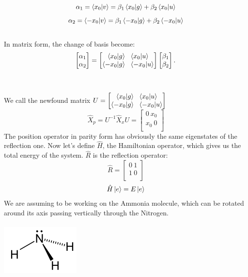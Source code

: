 \documentclass{article}
\begin{document}
$$ \alpha_1 =  \bra{x_0}\ket{v} = \beta_1 \bra{x_0}\ket{g} + \beta_2 \bra{x_0}\ket{u}$$
$$ \alpha_2 =  \bra{-x_0}\ket{v} = \beta_1 \bra{-x_0}\ket{g} + \beta_2 \bra{-x_0}\ket{u}$$\\
In matrix form, the change of basis become: \\
$$ \begin{bmatrix}
    \alpha_1 \\
    \alpha_2 \\ 
\end{bmatrix} = \begin{bmatrix}
    \bra{x_0}\ket{g} \ \ \bra{x_0}\ket{u} \\
    \bra{-x_0}\ket{g} \  \ \bra{-x_0}\ket{u} \\
\end{bmatrix} \begin{bmatrix}
    \beta_1 \\
    \beta_2 \\
\end{bmatrix}.$$ \\ \\
We call the newfound matrix $U = \begin{bmatrix}
    \bra{x_0}\ket{g} \ \ \bra{x_0}\ket{u} \\
    \bra{-x_0}\ket{g} \  \ \bra{-x_0}\ket{u} \\
\end{bmatrix} $
$$\hat{X}_p = U^{-1} \hat{X}_x U = \begin{bmatrix}
    0 \ x_0 \\
    x_0 \ 0 \\
\end{bmatrix}$$ 
The position operator in parity form has obviously the same eigenstates of the reflection one.
Now let's define $\hat{H}$, the Hamiltonian operator, which gives us the total energy of the system.
$\hat{R}$ is the reflection operator:
$$\hat{R} = \begin{bmatrix}
    0 \ 1 \\
    1 \ 0 \\
\end{bmatrix}$$
$$\hat{H} \ket{e} = E \ket{e}$$
We are assuming to be working on the Ammonia molecule, which can be rotated around its axis passing vertically through the Nitrogen.\\ \\
\includegraphics[scale = 0.75]{ammonia.png} \\ \\
\end{document}
